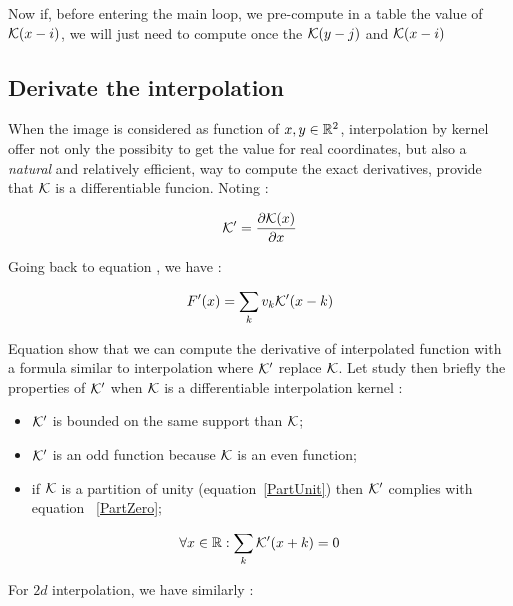 Now if, before entering the main loop, we pre-compute in a table the value of $\mathcal K(x-i)$,  
we will just need to  compute once the $\mathcal K(y-j)$ and $\mathcal K(x-i)$


\subsection{Derivate the interpolation}

\label{InterpDeriv}

When the image is considered as function of $x,y \in \mathbb{R}^2$, interpolation by kernel
offer not only the possibity to get the value for real coordinates, but also a \emph{natural}
and relatively efficient, way to compute the exact derivatives, provide that $\mathcal K$ is
a differentiable funcion. Noting :

\begin{equation}
       \mathcal K' =  \frac{\partial \mathcal K(x)}{\partial x}  \label{DefDerKern}
\end{equation}

Going back to equation \label{KernIntDef}, we have :


\begin{equation}
    F'(x)  = \sum_{k}  v_k  \mathcal K'(x-k)   \label{KernIntDeriv1D}
\end{equation}

Equation show that we can compute the derivative of interpolated function
with a formula similar to  interpolation where $\mathcal K'$ replace $\mathcal K$.
Let study then briefly the properties of $\mathcal K'$ when 
 $\mathcal K$ is a differentiable interpolation kernel :

\begin{itemize}
   \item  $\mathcal K'$ is bounded on the same support than $\mathcal K$;
   \item  $\mathcal K'$ is an odd function because $\mathcal K$ is an even function;
   \item  if $\mathcal K$ is a partition of unity (equation~\ref{PartUnit}) then $\mathcal K'$ complies with equation  ~\ref{PartZero};
\end{itemize}

\begin{equation}
    \forall x \in \mathbb{R} : \sum_k \mathcal K'(x+k) =   0 \label{PartZero}
\end{equation}

For $2d$ interpolation, we have similarly :

